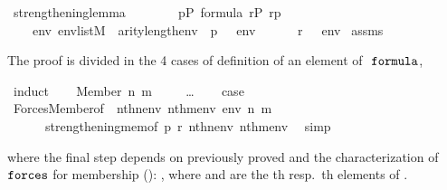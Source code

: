 \begin{isabelle}
\isamarkupfalse%
\ strengthening{\isacharunderscore}lemma{\isacharcolon}\isanewline
\ \ \ \isanewline
\ \ \ \ {\isachardoublequoteopen}p{\isasymin}P{\isachardoublequoteclose}\ {\isachardoublequoteopen}{\isasymphi}{\isasymin}formula{\isachardoublequoteclose}\ {\isachardoublequoteopen}r{\isasymin}P{\isachardoublequoteclose}\ {\isachardoublequoteopen}r{\isasympreceq}p{\isachardoublequoteclose}\isanewline
\ \ \isanewline
\ \ \ \ {\isachardoublequoteopen}{\isasymAnd}env{\isachardot}\ env{\isasymin}list{\isacharparenleft}M{\isacharparenright}\ {\isasymLongrightarrow}\ arity{\isacharparenleft}{\isasymphi}{\isacharparenright}{\isasymle}length{\isacharparenleft}env{\isacharparenright}\ {\isasymLongrightarrow}\ p\ {\isasymtturnstile}\ {\isasymphi}\ env\isanewline 
\ \ \ \ \ {\isasymLongrightarrow}\ r\ {\isasymtturnstile}\ {\isasymphi}\ env{\isachardoublequoteclose}\isanewline
%
%
\isamarkupfalse%
\ assms{\isacharparenleft}{}{\isacharparenright}
\end{isabelle}
%
The proof is divided in the 4 cases of definition of an element of $\formula$,
%
\begin{isabelle}
\isamarkupfalse%
\ {\isacharparenleft}induct{\isacharparenright}\isanewline
\ \ \isamarkupfalse%
\ {\isacharparenleft}Member\ n\ m{\isacharparenright}\isanewline
\ \ \isamarkupfalse%
\isanewline
\ \ \dots
\isanewline
\ \ \isamarkupfalse%
\ {\isacharquery}case\ \isanewline
\ \ \ \ \isamarkupfalse%
\ Forces{\isacharunderscore}Member{\isacharbrackleft}of\ {\isacharunderscore}\ {\isachardoublequoteopen}nth{\isacharparenleft}n{\isacharcomma}env{\isacharparenright}{\isachardoublequoteclose}\ {\isachardoublequoteopen}nth{\isacharparenleft}m{\isacharcomma}env{\isacharparenright}{\isachardoublequoteclose}\ env\ n\ m{\isacharbrackright}\isanewline
\ \ \ \ \ \ strengthening{\isacharunderscore}mem{\isacharbrackleft}of\ p\ r\ {\isachardoublequoteopen}nth{\isacharparenleft}n{\isacharcomma}env{\isacharparenright}{\isachardoublequoteclose}\ {\isachardoublequoteopen}nth{\isacharparenleft}m{\isacharcomma}env{\isacharparenright}{\isachardoublequoteclose}{\isacharbrackright}\ \isamarkupfalse%
\ simp
\end{isabelle}
%
where the final step depends on previously proved
 and the characterization of
$\mathop{\mathtt{forces}}$ for membership ():
,
where  and  are the
th resp.\ th elements of .

